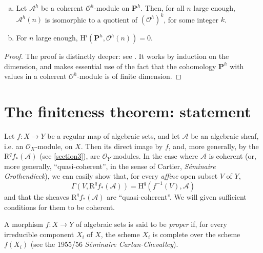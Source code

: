 \documentclass{article}
\theoremstyle{plain}
\newenvironment{corollary}[1]
  {\renewcommand\theinnercustomcorollary{#1}\innercustomcorollary}
  {\endinnercustomcorollary}
\theoremstyle{definition}
\newenvironment{definition}[1]
  {\renewcommand\theinnercustomdefinition{#1}\innercustomdefinition}
  {\endinnercustomdefinition}
\newcommand{\sh}{\mathscr}
\newcommand{\HH}{\mathrm{H}}
\newcommand{\RR}{\mathrm{R}}
\newcommand{\oldpage}[1]{\marginpar{\footnotesize$\Big\vert$ \textit{p.~#1}}}
\begin{document}
\begin{corollary}{1}
\label{corollary-3}
  \oldpage{2-07}
  \begin{enumerate}[(a)]
    \item Let $\sh{A}^h$ be a coherent $\sh{O}^h$-module on $\mathbf{P}^h$.
      Then, for all $n$ large enough, $\sh{A}^h(n)$ is isomorphic to a quotient of $(\sh{O}^h)^k$, for some integer $k$.
    \item For $n$ large enough, $\HH^i(\mathbf{P}^h,\sh{O}^h(n))=0$.
  \end{enumerate}
\end{corollary}

\begin{proof}
  The proof is distinctly deeper: see \cite[lemme~5, page~12, and lemma~8, page~24]{2}.
  It works by induction on the dimension, and makes essential use of the fact that the cohomology $\mathbf{P}^h$ with values in a coherent $\sh{O}^h$-module is of finite dimension.
\end{proof}


\section{The finiteness theorem: statement}
\label{section5}

Let $f\colon X\to Y$ be a regular map of algebraic sets, and let $\sh{A}$ be an algebraic sheaf, i.e. an $\sh{O}_X$-module, on $X$.
Then its direct image by $f$, and, more generally, by the $\RR^qf_*(\sh{A})$ (see \cref{section3}), are $\sh{O}_Y$-modules.
In the case where $\sh{A}$ is coherent (or, more generally, ``quasi-coherent'', in the sense of Cartier, \emph{Séminaire Grothendieck}), we can easily show that, for every \emph{affine} open subset $V$ of $Y$,
\[
  \Gamma(V,\RR^qf_*(\sh{A})) = \HH^q(f^{-1}(V),\sh{A})
\]
and that the sheaves $\RR^qf_*(\sh{A})$ are ``quasi-coherent''.
We will given sufficient conditions for them to be coherent.

\begin{definition}{2}
\label{definition2}
  A morphism $f\colon X\to Y$ of algebraic sets is said to be \emph{proper} if, for every irreducible component $X_i$ of $X$, the scheme $X_i$ is complete over the scheme $f(X_i)$ (see the 1955/56 \emph{Séminaire Cartan-Chevalley}).
\end{definition}
\end{document}
